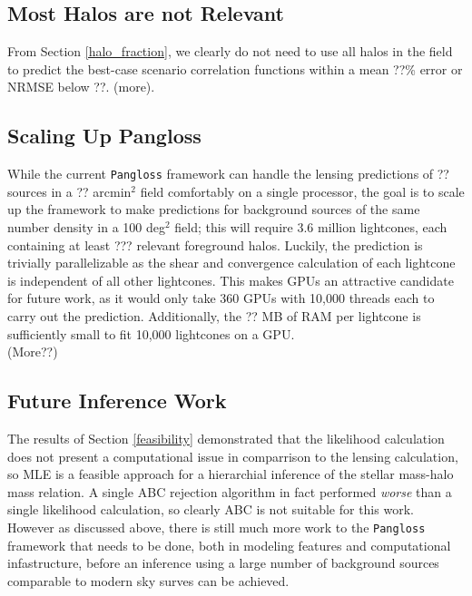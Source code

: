 \documentclass[%
 reprint,
 amsmath,amssymb,
 aps,nofootinbib
]{revtex4-1}
\begin{document}
\subsection{Most Halos are not Relevant}

From Section \ref{halo_fraction}, we clearly do not need to use all halos in the field to predict the best-case scenario correlation functions within a mean ??\% error or NRMSE below ??. (more).


\subsection{Scaling Up Pangloss}

While the current \texttt{Pangloss} framework can handle the lensing predictions of ?? sources in a ?? arcmin$^2$ field comfortably on a single processor, the goal is to scale up the framework to make predictions for background sources of the same number density in a 100 deg$^2$ field; this will require 3.6 million lightcones, each containing at least ??? relevant foreground halos. Luckily, the prediction is trivially parallelizable as the shear and convergence calculation of each lightcone is independent of all other lightcones. This makes GPUs an attractive candidate for future work, as it would only take 360 GPUs with 10,000 threads each to carry out the prediction. Additionally, the ?? MB of RAM per lightcone is sufficiently small to fit 10,000 lightcones on a GPU.\\

(More??)


\subsection{Future Inference Work}

The results of Section \ref{feasibility} demonstrated that the likelihood calculation does not present a computational issue in comparrison to the lensing calculation, so MLE is a feasible approach for a hierarchial inference of the stellar mass-halo mass relation. A single ABC rejection algorithm in fact performed \textit{worse} than a single likelihood calculation, so clearly ABC is not suitable for this work. However as discussed above, there is still much more work to the \texttt{Pangloss} framework that needs to be done, both in modeling features and computational infastructure, before an inference using a large number of background sources comparable to modern sky surves can be achieved.
\end{document}
